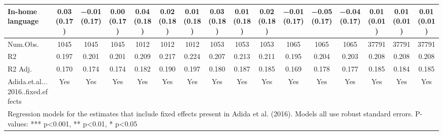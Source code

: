 \begin{table}
\begin{tabular}[t]{lccccccccccccccc}
In-home language & \num{0.03} (\num{0.17}) & \num{-0.01} (\num{0.17}) & \num{0.00} (\num{0.17}) & \num{0.04} (\num{0.18}) & \num{0.02} (\num{0.18}) & \num{0.01} (\num{0.18}) & \num{0.03} (\num{0.18}) & \num{0.01} (\num{0.18}) & \num{0.02} (\num{0.18}) & \num{-0.01} (\num{0.17}) & \num{-0.05} (\num{0.17}) & \num{-0.04} (\num{0.17}) & \num{0.01} (\num{0.01}) & \num{0.01} (\num{0.01}) & \num{0.01} (\num{0.01})\\
\midrule
Num.Obs. & \num{1045} & \num{1045} & \num{1045} & \num{1012} & \num{1012} & \num{1012} & \num{1053} & \num{1053} & \num{1053} & \num{1065} & \num{1065} & \num{1065} & \num{37791} & \num{37791} & \num{37791}\\
R2 & \num{0.197} & \num{0.201} & \num{0.201} & \num{0.209} & \num{0.217} & \num{0.224} & \num{0.207} & \num{0.213} & \num{0.211} & \num{0.195} & \num{0.204} & \num{0.203} & \num{0.208} & \num{0.208} & \num{0.208}\\
R2 Adj. & \num{0.170} & \num{0.174} & \num{0.174} & \num{0.182} & \num{0.190} & \num{0.197} & \num{0.180} & \num{0.187} & \num{0.185} & \num{0.169} & \num{0.178} & \num{0.177} & \num{0.185} & \num{0.184} & \num{0.185}\\
Adida.et.al...2016..fixed.effects & Yes & Yes & Yes & Yes & Yes & Yes & Yes & Yes & Yes & Yes & Yes & Yes & Yes & Yes & Yes\\
\bottomrule
\multicolumn{16}{l}{\rule{0pt}{1em}Regression models for the estimates that include fixed effects present in Adida et al. (2016). Models all use robust standard errors. P-values: *** p<0.001, ** p<0.01, * p<0.05}\\
\end{tabular}
\end{table}
